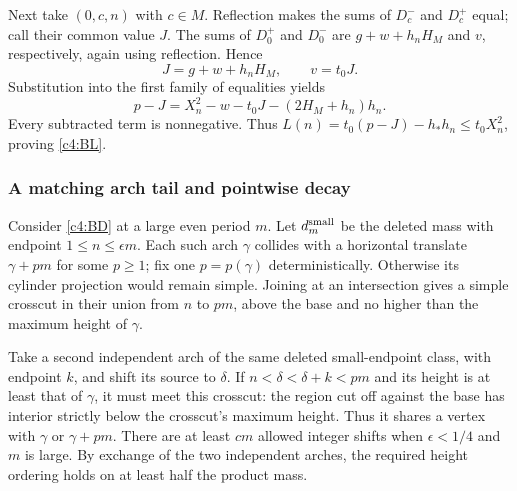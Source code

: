 Next take $(0,c,n)$ with $c\in M$. Reflection makes the sums of
$D_c^-$ and $D_c^+$ equal; call their common value $J$. The sums of
$D_0^+$ and $D_0^-$ are $g+w+h_nH_M$ and $v$, respectively, again
using reflection. Hence
\[
 J=g+w+h_nH_M,\qquad v=t_0J.
\]
Substitution into the first family of equalities yields
\[
 p-J=X_n^2-w-t_0J-(2H_M+h_n)h_n.
\]
Every subtracted term is nonnegative. Thus
$L(n)=t_0(p-J)-h_*h_n\le t_0X_n^2$, proving \eqref{c4:BL}.

\subsubsection{A matching arch tail and pointwise decay}
Consider \eqref{c4:BD} at a large even period $m$. Let
$d_m^{\rm small}$ be the deleted mass with endpoint
$1\le n\le\epsilon m$. Each such arch $\gamma$ collides with a
horizontal translate $\gamma+pm$ for some $p\ge1$; fix one
$p=p(\gamma)$ deterministically. Otherwise its cylinder projection
would remain simple. Joining at an intersection gives a simple
crosscut in their union from $n$ to $pm$, above the base and no higher
than the maximum height of $\gamma$.

Take a second independent arch of the same deleted small-endpoint
class, with endpoint $k$, and shift its source to $\delta$. If
$n<\delta<\delta+k<pm$ and its height is at least that of $\gamma$,
it must meet this crosscut: the region cut off against the base has
interior strictly below the crosscut's maximum height. Thus it shares
a vertex with $\gamma$ or $\gamma+pm$. There are at least $cm$
allowed integer shifts when $\epsilon<1/4$ and $m$ is large.
By exchange of the two independent arches, the required height
ordering holds on at least half the product mass.

